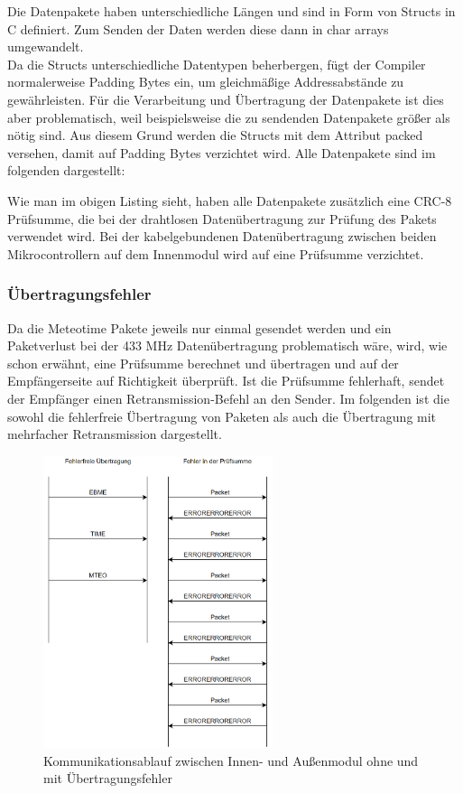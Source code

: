 \documentclass[a4paper,11pt]{article}
\begin{document}
\noindent
Die Datenpakete haben unterschiedliche Längen und sind in Form von Structs in C definiert. Zum Senden der Daten werden diese dann in char arrays umgewandelt. \\
Da die Structs unterschiedliche Datentypen beherbergen, fügt der Compiler normalerweise Padding Bytes ein, um gleichmäßige Addressabstände zu gewährleisten. 
Für die Verarbeitung und Übertragung der Datenpakete ist dies aber problematisch, weil beispielsweise die zu sendenden Datenpakete größer als nötig sind. 
Aus diesem Grund werden die Structs mit dem Attribut packed versehen, damit auf Padding Bytes verzichtet wird. 
Alle Datenpakete sind im folgenden dargestellt:

\newpage


\noindent
Wie man im obigen Listing sieht, haben alle Datenpakete zusätzlich eine CRC-8 Prüfsumme, die bei der drahtlosen Datenübertragung 
zur Prüfung des Pakets verwendet wird. Bei der kabelgebundenen Datenübertragung zwischen beiden Mikrocontrollern
auf dem Innenmodul wird auf eine Prüfsumme verzichtet. 

\subsubsection{Übertragungsfehler}
\label{subsubsub:uebertragungsfehler}

Da die Meteotime Pakete jeweils nur einmal gesendet werden und ein Paketverlust bei der 433 MHz Datenübertragung problematisch wäre, wird, wie schon erwähnt, eine Prüfsumme
berechnet und übertragen und auf der Empfängerseite auf Richtigkeit überprüft. Ist die Prüfsumme fehlerhaft, sendet der Empfänger einen Retransmission-Befehl an den Sender.
Im folgenden ist die sowohl die fehlerfreie Übertragung von Paketen als auch die Übertragung mit mehrfacher Retransmission dargestellt. 

\begin{figure}[H]
  \centering
  \includegraphics[width=0.6\textwidth]{Kommunikation}
  \caption{Kommunikationsablauf zwischen Innen- und Außenmodul ohne und mit Übertragungsfehler}
  \label{fig:kommunikation}
\end{figure}
\end{document}
